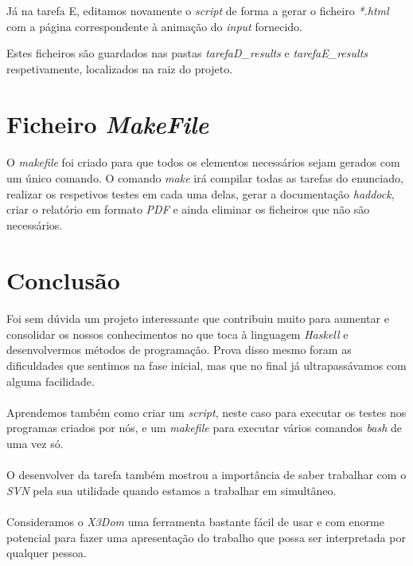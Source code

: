 \documentclass[a4paper,12pt]{article}
\begin{document}
Já na tarefa E, editamos novamente o \emph{script} de forma a gerar o ficheiro \emph{*.html} com a página correspondente à animação do \emph{input} fornecido.

Estes ficheiros são guardados nas pastas \emph{tarefaD\_results} e \emph{tarefaE\_results} respetivamente, localizados na raiz do projeto.


\section{Ficheiro \emph{MakeFile}}

\paragraph{}
O \emph{makefile} foi criado para que todos os elementos necessários sejam gerados com um único comando. O comando \emph{make} irá compilar todas as tarefas do enunciado, realizar os respetivos testes em cada uma delas, gerar a documentação \emph{haddock}, criar o relatório em formato \emph{PDF} e ainda eliminar os ficheiros que não são necessários.

\section{Conclusão}

\paragraph{}
Foi sem dúvida um projeto interessante que contribuiu muito para aumentar e consolidar os nossos conhecimentos no que toca à linguagem \emph{Haskell} e desenvolvermos métodos de programação. Prova disso mesmo foram as dificuldades que sentimos na fase inicial, mas que no final já ultrapassávamos com alguma facilidade.

\paragraph{}
Aprendemos também como criar um \emph{script}, neste caso para executar os testes nos programas criados por nós, e um \emph{makefile} para executar vários comandos \emph{bash} de uma vez só.
\paragraph{}
O desenvolver da tarefa também mostrou a importância de saber trabalhar com o \emph{SVN} pela sua utilidade quando estamos a trabalhar em simultâneo.
\paragraph{}
Consideramos o \emph{X3Dom} uma ferramenta bastante fácil de usar e com enorme potencial para fazer uma apresentação do trabalho que possa ser interpretada por qualquer pessoa.
\end{document}
